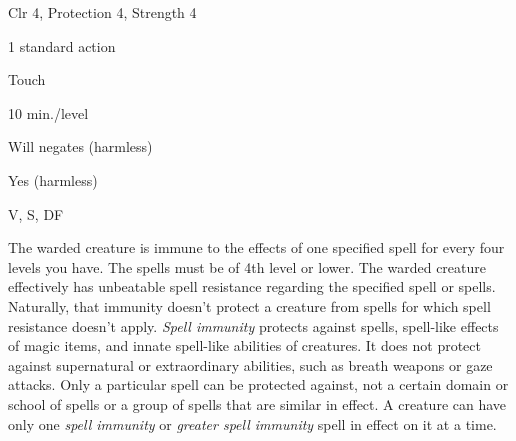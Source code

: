 
\begin{description*}
\item[Level:] Clr 4, Protection 4, Strength 4
\item[Casting Time:] 1 standard action
\item[Range:] Touch
\item[Duration:] 10 min./level
\item[Saving Throw:] Will negates (harmless)
\item[Spell Resistance:] Yes (harmless)
\item[Components:] V, S, DF
\end{description*}

The warded creature is immune to the effects of one specified spell for every four
levels you have. The spells must be of 4th level or lower. The warded creature
effectively has unbeatable spell resistance regarding the specified spell or spells.
Naturally, that immunity doesn't protect a creature from spells for which spell
resistance doesn't apply. \textit{Spell immunity} protects against spells, spell-like
effects of magic items, and innate spell-like abilities of creatures. It does not
protect against supernatural or extraordinary abilities, such as breath weapons
or gaze attacks.
Only a particular spell can be protected against, not a certain domain or school
of spells or a group of spells that are similar in effect.
A creature can have only one \textit{spell immunity} or \textit{greater spell immunity
}spell in effect on it at a time.